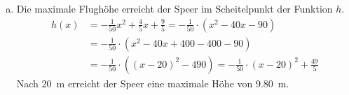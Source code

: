 \begin{exercise}
\begin{enumerate}[a)]
\begin{alignat*}{3}
                \noeq
                &
                p&=-\num{40}
                &
                \nomod
                \\
                \noeq
                &
                q&=-\num{90}
                &
                \nomod
                \\
                \noeq
                &
                x_{1,2}&=-\frac{p}{2}\pm\sqrt{\left(\frac{p}{2}\right)^2-q}
                &
                \nomod
                \\
                \noeq
                &
                &=\num{20}\pm\sqrt{\left(-\num{20}\right)^2-\left(-\num{90}\right)}
                &
                \nomod
                \\
                \noeq
                &
                &=\num{20}\pm\sqrt{\num{490}}
                &
                \nomod
                \\
                \noeq
                &
                x_1&\approx-\num{2.135944}
                &
                \nomod
                \\
                \noeq
                &
                x_2&\approx\num{42.135944}
                &
                \nomod
              \end{alignat*}
            \endgroup
            Der Speer fliegt also erwa \SI{42.14}{\metre} weit.
      \item Die maximale Flughöhe erreicht der Speer
            im Scheitelpunkt der Funktion $h$.
            \begin{equation*}
              \begin{split}
                h(x)&=-\frac{\num{1}}{\num{50}}x^{2}+\frac{\num{4}}{\num{5}}x+\frac{\num{9}}{\num{5}}
                =-\frac{\num{1}}{\num{50}}\cdot\left(x^{2}-\num{40}x-\num{90}\right)
                \\[1ex]
                &=-\frac{\num{1}}{\num{50}}\cdot\left(x^{2}-\num{40}x+\num{400}-\num{400}-\num{90}\right)
                \\[1ex]
                &=-\frac{\num{1}}{\num{50}}\cdot\left(\left(x-20\right)^{2}-\num{490}\right)
                =-\frac{\num{1}}{\num{50}}\cdot\left(x-20\right)^{2}+\frac{\num{49}}{\num{5}}
              \end{split}
            \end{equation*}
            Nach \SI{20}{\metre} erreicht der Speer
            eine maximale Höhe von \SI{9.80}{\metre}.
    \end{enumerate}
  \fi
\end{exercise}
